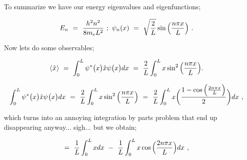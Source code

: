 \documentclass{article}
\begin{document}
To summarize we have our energy eigenvalues and eigenfunctions; 

\begin{equation} \label{eb-eq-241-1}
E_n \hspace{0.125cm} = \hspace{0.125cm} \frac{h^{2}n^{2}}{8m_{e}L^{2}} \hspace{0.125cm} ; \hspace{0.125cm} \psi_{n}(x) \hspace{0.125cm} = \hspace{0.125cm} \sqrt{\frac{2}{L}}\sin\Big( \frac{n\pi x}{L} \Big) \hspace{0.125cm} . 
\end{equation}

Now lets do some observables;

\begin{equation} \label{eb-eq-242-1}
\langle \hspace{0.0125cm} \hat{x} \hspace{0.0125cm} \rangle \hspace{0.125cm} = \hspace{0.125cm} \int_{0}^{L} \psi^{\ast}\big(x\big) \hat{x} \psi\big(x\big) dx \hspace{0.125cm} = \hspace{0.125cm} \frac{2}{L} \int_{0}^{L} x \sin^2\Big(\frac{n\pi x}{L}\Big) . 
\end{equation}

\begin{equation} \label{eb-eq-243-1}
\int_{0}^{L} \psi^{\ast}\big(x\big) \hat{x} \psi\big(x\big) dx \hspace{0.125cm} = \hspace{0.125cm} \frac{2}{L} \int_{0}^{L} x \sin^2\Big(\frac{n\pi x}{L}\Big) \hspace{0.125cm} = \hspace{0.125cm}  \frac{2}{L} \int_{0}^{L} x \bigg( \frac{1 - \cos\Big(\frac{2n\pi x}{L}\Big)}{2} \bigg) dx \hspace{0.125cm} ,
\end{equation}

which turns into an annoying integration by parts problem that end up disappearing anyway... sigh... but we obtain;

\begin{equation} \label{eb-eq-244-1}
= \hspace{0.125cm} \frac{1}{L} \int_{0}^{L} x dx \hspace{0.125cm} - \hspace{0.125cm} \frac{1}{L} \int_{0}^{L} x \cos\Big(\frac{2n\pi x}{L}\Big) dx \hspace{0.125cm} , 
\end{equation}
\end{document}
